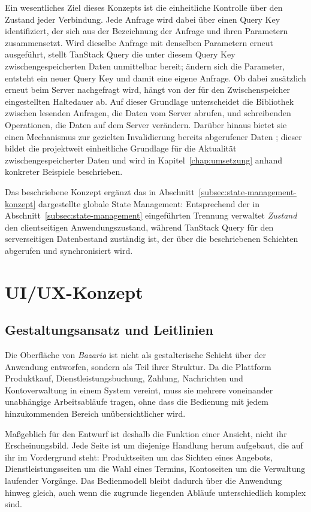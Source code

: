 Ein wesentliches Ziel dieses Konzepts ist die einheitliche Kontrolle
über den Zustand jeder Verbindung. Jede Anfrage wird dabei über einen
Query Key identifiziert, der sich aus der Bezeichnung der Anfrage
und ihren Parametern zusammensetzt. Wird dieselbe Anfrage mit denselben Parametern erneut ausgeführt,
stellt TanStack Query die unter diesem Query Key zwischengespeicherten
Daten unmittelbar bereit; ändern sich die Parameter, entsteht ein
neuer Query Key und damit eine eigene Anfrage. Ob dabei zusätzlich
erneut beim Server nachgefragt wird, hängt von der für den
Zwischenspeicher eingestellten Haltedauer ab. Auf dieser Grundlage unterscheidet die Bibliothek zwischen
lesenden Anfragen, die Daten vom Server abrufen, und schreibenden
Operationen, die Daten auf dem Server verändern. Darüber hinaus
bietet sie einen Mechanismus zur gezielten Invalidierung bereits
abgerufener Daten \cite{tanstack_query_docs}; dieser bildet die
projektweit einheitliche Grundlage für die Aktualität
zwischengespeicherter Daten und wird in Kapitel~\ref{chap:umsetzung}
anhand konkreter Beispiele beschrieben.

Das beschriebene Konzept ergänzt das in
Abschnitt~\ref{subsec:state-management-konzept} dargestellte globale
State Management: Entsprechend der in
Abschnitt~\ref{subsec:state-management} eingeführten Trennung
verwaltet \textit{Zustand} den clientseitigen Anwendungszustand,
während TanStack Query für den serverseitigen Datenbestand zuständig
ist, der über die beschriebenen Schichten abgerufen und
synchronisiert wird.


\section{UI/UX-Konzept}
\label{sec:uiux_konzept}

\subsection{Gestaltungsansatz und Leitlinien}
\label{subsec:gestaltungsansatz}

Die Oberfläche von \textit{Bazario} ist nicht als gestalterische
Schicht über der Anwendung entworfen, sondern als Teil ihrer
Struktur. Da die Plattform Produktkauf, Dienstleistungsbuchung,
Zahlung, Nachrichten und Kontoverwaltung in einem System vereint,
muss sie mehrere voneinander unabhängige Arbeitsabläufe tragen, ohne
dass die Bedienung mit jedem hinzukommenden Bereich
unübersichtlicher wird.

Maßgeblich für den Entwurf ist deshalb die Funktion einer Ansicht,
nicht ihr Erscheinungsbild. Jede Seite ist um diejenige Handlung
herum aufgebaut, die auf ihr im Vordergrund steht: Produktseiten um
das Sichten eines Angebots, Dienstleistungsseiten um die Wahl eines
Termins, Kontoseiten um die Verwaltung laufender Vorgänge. Das
Bedienmodell bleibt dadurch über die Anwendung hinweg gleich, auch
wenn die zugrunde liegenden Abläufe unterschiedlich komplex sind.

